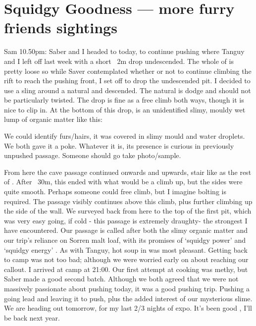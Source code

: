 \section{Squidgy Goodness --- more furry friends sightings}

Sam 10.50pm: Saber and I headed to  today, to continue pushing where Tanguy and I left off last week with a short ~2m drop undescended. The whole of  is pretty loose so while Saver contemplated whether or not to continue climbing the rift to reach the pushing front, I set off to drop the undescended pit.
I decided to use a sling around a natural and descended. The natural is dodge and should not be particularly twisted. The drop is fine as a free climb both ways, though it is nice to clip in. At the bottom of this drop, is an unidentified slimy, mouldy wet lump of organic matter like this: 

We could identify furs/hairs, it was covered in slimy mould and water droplets. We both gave it a poke. Whatever it is, its presence is curious in previously unpushed passage. Someone should go take photo/sample.



From here the cave passage continued onwards and upwards, stair like as the rest of . After ~30m, this ended with what would be a climb up, but the sides were quite smooth. Perhaps someone could free climb, but I imagine bolting is required. The passage visibly continues above this climb, plus further climbing up the side of the wall. We surveyed back from here to  the top of the first pit, which was very easy going, if cold  - this passage is extremely draughty- the strongest I have encountered. Our passage is called   after both the slimy organic matter and our trip’s reliance on Sorren malt loaf, with its promises of ‘squidgy power’ and ‘squidgy energy’ . As with Tanguy, hot soup in  was most pleasant.
Getting back to camp was not too bad; although we were worried early on about reaching our callout. I arrived at camp at 21:00. Our first attempt at cooking was methy, but Saber made a good second batch. Although we both agreed that we were not massively passionate about pushing today, it was a good pushing trip. Pushing a going lead and leaving it to push, plus the added interest of our mysterious slime.
We are heading out tomorrow, for my last 2/3 nights of expo. It’s been good , I’ll be back next year.

